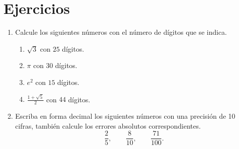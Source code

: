 
\section*{Ejercicios}

\begin{enumerate}

	\item Calcule los siguientes números con el número de
dígitos que se indica.
	\begin{enumerate}
		\item $\sqrt{3}$ con $25$ dígitos.
		\item $\pi$ con $30$ dígitos.
		\item $e^2$ con $15$ dígitos.
		\item $\frac{1+\sqrt{5}}{2}$ con $44$ dígitos.
	\end{enumerate}

	\item Escriba en forma decimal los siguientes números con una precisión
de 10 cifras, también calcule los errores absolutos correspondientes.
\begin{equation*}
	\frac{2}{5},\qquad \frac{8}{10}, \qquad \frac{71}{100}.
\end{equation*}

\end{enumerate}
